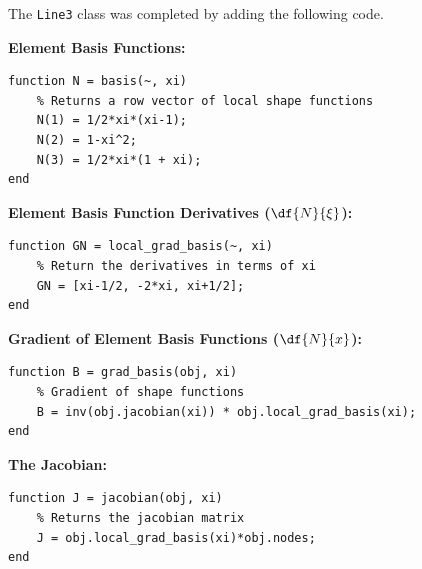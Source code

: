 The \texttt{Line3} class was completed by adding the following code.

\textbf{Element Basis Functions:}
\begin{lstlisting}
function N = basis(~, xi)
	% Returns a row vector of local shape functions
	N(1) = 1/2*xi*(xi-1);
	N(2) = 1-xi^2;
	N(3) = 1/2*xi*(1 + xi);
end
\end{lstlisting}

\textbf{Element Basis Function Derivatives ($\df{N}{\xi}$):}
\begin{lstlisting}
function GN = local_grad_basis(~, xi)
	% Return the derivatives in terms of xi
	GN = [xi-1/2, -2*xi, xi+1/2];
end
\end{lstlisting}

\textbf{Gradient of Element Basis Functions ($\df{N}{x}$):}
\begin{lstlisting}
function B = grad_basis(obj, xi) 
	% Gradient of shape functions
	B = inv(obj.jacobian(xi)) * obj.local_grad_basis(xi);
end
\end{lstlisting}

\textbf{The Jacobian:}
\begin{lstlisting}
function J = jacobian(obj, xi)
	% Returns the jacobian matrix
	J = obj.local_grad_basis(xi)*obj.nodes;                 
end
\end{lstlisting}


